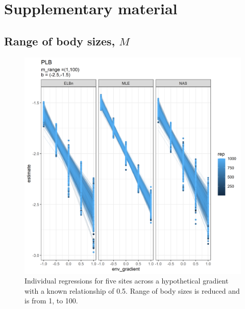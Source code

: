 \documentclass[
]{article}
\newcommand{\beginsupplement}{ \setcounter{table}{0} \renewcommand{\thetable}{S\arabic{table}} \setcounter{figure}{0} \renewcommand{\thefigure}{S\arabic{figure}}}
\begin{document}
\newpage

\hypertarget{supplementary-material}{%
\section*{Supplementary material}\label{supplementary-material}}

\beginsupplement

\hypertarget{range-of-body-sizes-m}{%
\subsection{\texorpdfstring{Range of body sizes,
\(M\)}{Range of body sizes, M}}\label{range-of-body-sizes-m}}

\begin{figure}
\centering
\includegraphics{figures/PLB_small_m_main.png}
\caption{Individual regressions for five sites across a hypothetical
gradient with a known relationship of 0.5. Range of body sizes is
reduced and is from 1, to 100.}
\end{figure}

\newpage
\end{document}
